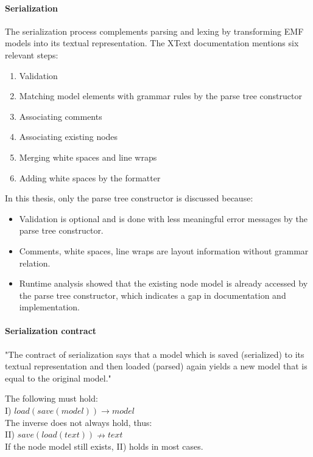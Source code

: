 \paragraph{Serialization}
The serialization process complements parsing and lexing by transforming EMF models into its textual representation. The XText documentation mentions six relevant steps:

\begin{enumerate}
	\item Validation
	\item Matching model elements with grammar rules by the parse tree constructor
	\item Associating comments
	\item Associating existing nodes
	\item Merging white spaces and line wraps
	\item Adding white spaces by the formatter
\end{enumerate}

In this thesis, only the parse tree constructor is discussed because:
\begin{itemize}
	\item Validation is optional and is done with less meaningful error messages by the parse tree constructor.
	\item Comments, white spaces, line wraps are layout information without grammar relation.
	\item Runtime analysis showed that the existing node model is already accessed by the parse tree constructor, which indicates a gap in documentation and implementation.
\end{itemize}

\paragraph{Serialization contract}
"The contract of serialization says that a model which is saved (serialized) to its textual representation and then loaded (parsed) again yields a new model that is equal to the original model."\cite{XTextMan}

The following must hold:\\
I) $load(save(model)) \rightarrow model$\\
The inverse does not always hold, thus:\\
II) $save(load(text)) \nrightarrow text$\\
If the node model still exists, II) holds in most cases. 

